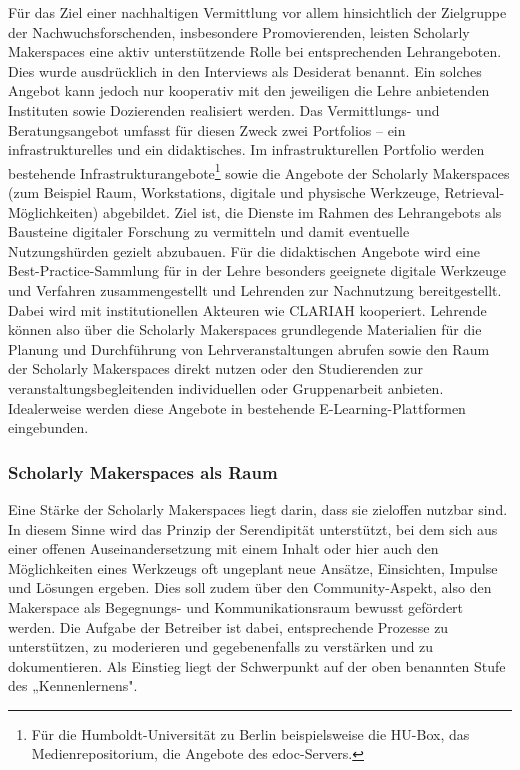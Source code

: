 \documentclass[a4paper,
fontsize=11pt,
oneside,
numbers=noperiodatend,
parskip=half-,
bibliography=totoc,
final
]{scrartcl}
\begin{document}
Für das Ziel einer nachhaltigen Vermittlung vor allem hinsichtlich der
Zielgruppe der Nachwuchsforschenden, insbesondere Promovierenden,
leisten Scholarly Makerspaces eine aktiv unterstützende Rolle bei
entsprechenden Lehrangeboten. Dies wurde ausdrücklich in den Interviews
als Desiderat benannt. Ein solches Angebot kann jedoch nur kooperativ
mit den jeweiligen die Lehre anbietenden Instituten sowie Dozierenden
realisiert werden. Das Vermittlungs- und Beratungsangebot umfasst für
diesen Zweck zwei Portfolios -- ein infrastrukturelles und ein
didaktisches. Im infrastrukturellen Portfolio werden bestehende
Infrastrukturangebote\footnote{Für die Humboldt-Universität zu Berlin
  beispielsweise die HU-Box, das Medienrepositorium, die Angebote des
  edoc-Servers.} sowie die Angebote der Scholarly Makerspaces (zum
Beispiel Raum, Workstations, digitale und physische Werkzeuge,
Retrieval-Möglichkeiten) abgebildet. Ziel ist, die Dienste im Rahmen des
Lehrangebots als Bausteine digitaler Forschung zu vermitteln und damit
eventuelle Nutzungshürden gezielt abzubauen. Für die didaktischen
Angebote wird eine Best-Practice-Sammlung für in der Lehre besonders
geeignete digitale Werkzeuge und Verfahren zusammengestellt und
Lehrenden zur Nachnutzung bereitgestellt. Dabei wird mit
institutionellen Akteuren wie CLARIAH kooperiert. Lehrende können also
über die Scholarly Makerspaces grundlegende Materialien für die Planung
und Durchführung von Lehrveranstaltungen abrufen sowie den Raum der
Scholarly Makerspaces direkt nutzen oder den Studierenden zur
veranstaltungsbegleitenden individuellen oder Gruppenarbeit anbieten.
Idealerweise werden diese Angebote in bestehende E-Learning-Plattformen
eingebunden.

\hypertarget{scholarly-makerspaces-als-raum}{%
\subsubsection{Scholarly Makerspaces als
Raum}\label{scholarly-makerspaces-als-raum}}

Eine Stärke der Scholarly Makerspaces liegt darin, dass sie zieloffen
nutzbar sind. In diesem Sinne wird das Prinzip der Serendipität
unterstützt, bei dem sich aus einer offenen Auseinandersetzung mit einem
Inhalt oder hier auch den Möglichkeiten eines Werkzeugs oft ungeplant
neue Ansätze, Einsichten, Impulse und Lösungen ergeben. Dies soll zudem
über den Community-Aspekt, also den Makerspace als Begegnungs- und
Kommunikationsraum bewusst gefördert werden. Die Aufgabe der Betreiber
ist dabei, entsprechende Prozesse zu unterstützen, zu moderieren und
gegebenenfalls zu verstärken und zu dokumentieren. Als Einstieg liegt
der Schwerpunkt auf der oben benannten Stufe des „Kennenlernens".
\end{document}
